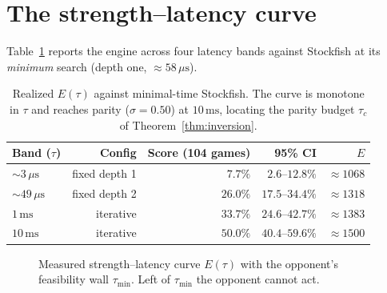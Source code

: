 \documentclass[11pt,oneside]{book}
\theoremstyle{definition}
\theoremstyle{plain}
\theoremstyle{remark}
\newcommand{\Elo}{E}
\newcommand{\budget}{\tau}
\newcommand{\score}{\sigma}
\begin{document}
\section{The strength--latency curve}
Table~\ref{tab:curve} reports the engine across four latency bands against Stockfish at its
\emph{minimum} search (depth one, $\approx 58\,\mu\mathrm{s}$).

\begin{table}[h]\centering
\begin{tabular}{lrrrr}
\toprule
Band ($\budget$) & Config & Score (104 games) & 95\% CI & $\Elo$\\
\midrule
$\sim 3\,\mu\mathrm{s}$  & fixed depth 1 & $7.7\%$  & $2.6$--$12.8\%$ & $\approx 1068$\\
$\sim 49\,\mu\mathrm{s}$ & fixed depth 2 & $26.0\%$ & $17.5$--$34.4\%$ & $\approx 1318$\\
$1\,\mathrm{ms}$         & iterative     & $33.7\%$ & $24.6$--$42.7\%$ & $\approx 1383$\\
$10\,\mathrm{ms}$        & iterative     & $50.0\%$ & $40.4$--$59.6\%$ & $\approx 1500$\\
\bottomrule
\end{tabular}
\caption{Realized $\Elo(\budget)$ against minimal-time Stockfish. The curve is monotone in
$\budget$ and reaches parity ($\score=0.50$) at $10\,\mathrm{ms}$, locating the parity
budget $\budget_c$ of Theorem~\ref{thm:inversion}.}
\label{tab:curve}
\end{table}

\begin{figure}[h]\centering
{}
\caption{Measured strength--latency curve $\Elo(\budget)$ with the opponent's feasibility
wall $\budget_{\min}$. Left of $\budget_{\min}$ the opponent cannot act.}
\label{fig:curve}
\end{figure}
\end{document}
